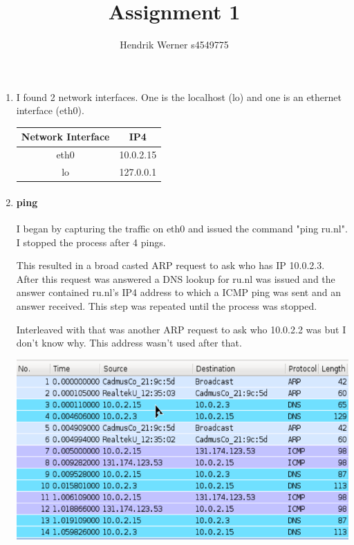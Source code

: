 \documentclass[12pt, a4paper]{article}
\title{Assignment 1}
\author{Hendrik Werner s4549775}
\begin{document}
\maketitle

\section{} %
\begin{enumerate}[a]
	\item %
	\begin{multicols}{2}
		I found 2 network interfaces. One is the localhost (lo) and one is an ethernet interface (eth0).

		\begin{tabular}{c|c}
			Network Interface & IP4\\\hline
			eth0 & 10.0.2.15\\
			lo & 127.0.0.1\\
		\end{tabular}
	\end{multicols}

	\item %
	\paragraph{ping}
	I began by capturing the traffic on eth0 and issued the command "ping ru.nl". I stopped the process after 4 pings.

	This resulted in a broad casted ARP request to ask who has IP 10.0.2.3. After this request was answered a DNS lookup for ru.nl was issued and the answer contained ru.nl's IP4 address to which a ICMP ping was sent and an answer received. This step was repeated until the process was stopped.

	Interleaved with that was another ARP request to ask who 10.0.2.2 was but I don't know why. This address wasn't used after that.

	\includegraphics[width=\linewidth]{images/ping}


\end{enumerate}
\end{document}
